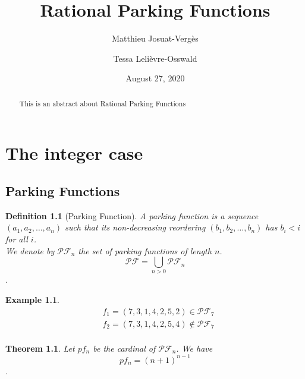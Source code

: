 \documentclass[12pt]{report}
\newtheorem{theorem}{Theorem}
\newtheorem{definition}{Definition}
\newtheorem*{example}{Example}
\begin{document}
\title{Rational Parking Functions}
\author{Matthieu Josuat-Vergès \and Tessa Lelièvre-Osswald}
\date{August 27, 2020}

\maketitle

\begin{abstract}
    This is an abstract about Rational Parking Functions
\end{abstract}

\tableofcontents

\chapter{The integer case}

\section{Parking Functions}

\begin{definition}[Parking Function]
    A \emph{parking function} is a sequence $(a_1, a_2, \ldots, a_n)$
    such that its non-decreasing reordering $(b_1, b_2, \ldots, b_n)$
    has $b_i < i$ for all $i$.\\
    We denote by $\mathcal{PF}_n$ the set of parking functions of length $n$.
    $$\mathcal{PF} = \bigcup_{n > 0}{\mathcal{PF}_n}$$.
\end{definition}

\begin{example}
    \begin{align*}
    &f_1 = (7, 3, 1, 4, 2, 5, 2) \in \mathcal{PF}_7\\
    &f_2 = (7, 3, 1, 4, 2, 5, 4) \notin \mathcal{PF}_7\\
    \end{align*}
\end{example}

\begin{theorem}
    Let $pf_n$ be the cardinal of $\mathcal{PF}_n$.
    We have $$pf_n = (n + 1)^{n-1}$$.
\end{theorem}
\end{document}
